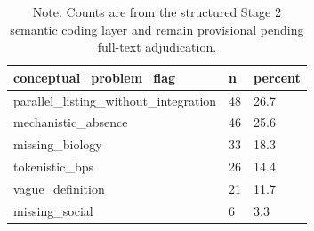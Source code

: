 \begin{table}[htbp]
\raggedright
\caption{Secondary Research Question. Conceptual problems in BPS usage.}
\label{tab.conceptual.problems}
\begin{tabular}{lll}
\toprule
conceptual\_problem\_flag & n & percent \\
\midrule
parallel\_listing\_without\_integration & 48 & 26.7 \\
mechanistic\_absence & 46 & 25.6 \\
missing\_biology & 33 & 18.3 \\
tokenistic\_bps & 26 & 14.4 \\
vague\_definition & 21 & 11.7 \\
missing\_social & 6 & 3.3 \\
\bottomrule
\end{tabular}

\caption*{Note. Counts are from the structured Stage 2 semantic coding layer and remain provisional pending full-text adjudication.}
\end{table}

